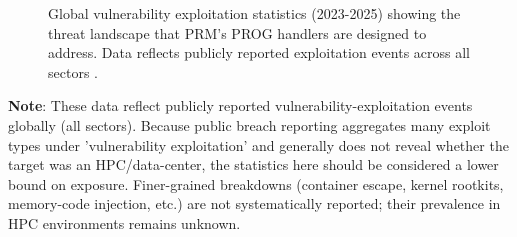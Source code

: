 \begin{figure}[htbp]
\centering
{}
\caption{Global vulnerability exploitation statistics (2023-2025) showing the threat landscape that PRM's PROG handlers are designed to address. Data reflects publicly reported exploitation events across all sectors \cite{vulncheck2024trends,verizon2024dbir}.}
\label{fig:vuln_stats}
\end{figure}

\textbf{Note}: These data reflect publicly reported vulnerability-exploitation events globally (all sectors). Because public breach reporting aggregates many exploit types under 'vulnerability exploitation' and generally does not reveal whether the target was an HPC/data-center, the statistics here should be considered a lower bound on exposure. Finer-grained breakdowns (container escape, kernel rootkits, memory-code injection, etc.) are not systematically reported; their prevalence in HPC environments remains unknown.